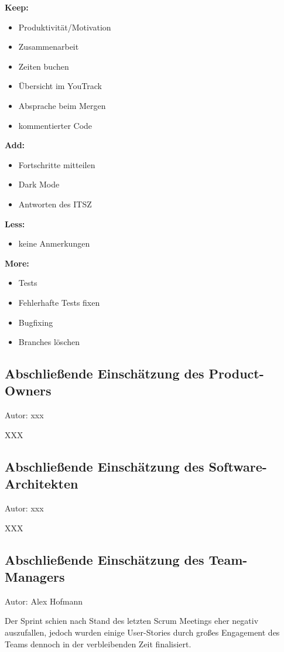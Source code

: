 \textbf{Keep:}
\begin{itemize}
\item Produktivität/Motivation
\item Zusammenarbeit 
\item Zeiten buchen
\item Übersicht im YouTrack
\item Absprache beim Mergen
\item kommentierter Code
\end{itemize}

\textbf{Add:}
\begin{itemize}
\item Fortschritte mitteilen
\item Dark Mode
\item Antworten des ITSZ
\end{itemize}

\textbf{Less:}
\begin{itemize}
\item keine Anmerkungen
\end{itemize}

\textbf{More:}
\begin{itemize}
\item Tests
\item Fehlerhafte Tests fixen
\item Bugfixing
\item Branches löschen
\end{itemize}


\subsection{Abschließende Einschätzung des Product-Owners}
{\small Autor: xxx}

XXX

\subsection{Abschließende Einschätzung des Software-Architekten}
{\small Autor: xxx}

XXX

\subsection{Abschließende Einschätzung des Team-Managers}
{\small Autor: Alex Hofmann}

Der Sprint schien nach Stand des letzten Scrum Meetings eher negativ auszufallen, jedoch wurden einige User-Stories durch großes Engagement des Teams dennoch in der verbleibenden Zeit finalisiert.


